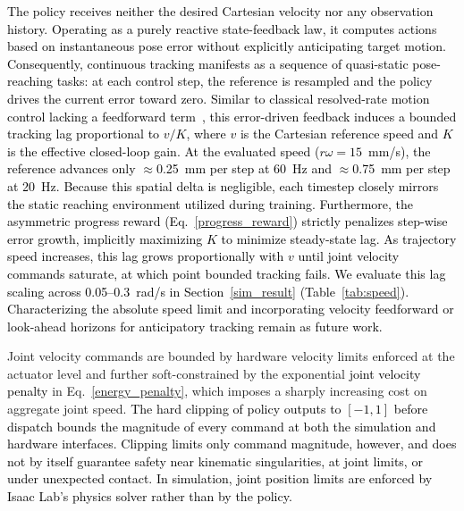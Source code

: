 \documentclass[preprint,12pt]{elsarticle}
\begin{document}
\noindent\textcolor{black}{The policy receives neither the desired Cartesian velocity nor any observation history. Operating as a purely reactive state-feedback law, it computes actions based on instantaneous pose error without explicitly anticipating target motion. Consequently, continuous tracking manifests as a sequence of quasi-static pose-reaching tasks: at each control step, the reference is resampled and the policy drives the current error toward zero. Similar to classical resolved-rate motion control lacking a feedforward term~\cite{whiteney1969resolved}, this error-driven feedback induces a bounded tracking lag proportional to $v/K$, where $v$ is the Cartesian reference speed and $K$ is the effective closed-loop gain. At the evaluated speed ($r\omega = 15$~mm/s), the reference advances only $\approx$0.25~mm per step at 60~Hz and $\approx$0.75~mm per step at 20~Hz. Because this spatial delta is negligible, each timestep closely mirrors the static reaching environment utilized during training. Furthermore, the asymmetric progress reward (Eq.~\eqref{progress_reward}) strictly penalizes step-wise error growth, implicitly maximizing $K$ to minimize steady-state lag. As trajectory speed increases, this lag grows proportionally with $v$ until joint velocity commands saturate, at which point bounded tracking fails. We evaluate this lag scaling across 0.05--0.3~rad/s in Section~\ref{sim_result} (Table~\ref{tab:speed}). Characterizing the absolute speed limit and incorporating velocity feedforward or look-ahead horizons for anticipatory tracking remain as future work.}

Joint velocity commands are bounded by hardware velocity limits enforced at the actuator level and further soft-constrained by the exponential \textcolor{black}{joint velocity penalty} in Eq.~\eqref{energy_penalty}, which imposes a sharply increasing cost on aggregate joint speed. \textcolor{black}{The hard clipping of policy outputs to $[-1,1]$ before dispatch bounds the magnitude of every command at both the simulation and hardware interfaces. Clipping limits only command magnitude, however, and does not by itself guarantee safety near kinematic singularities, at joint limits, or under unexpected contact. In simulation, joint position limits are enforced by Isaac Lab's physics solver rather than by the policy.}
\end{document}
